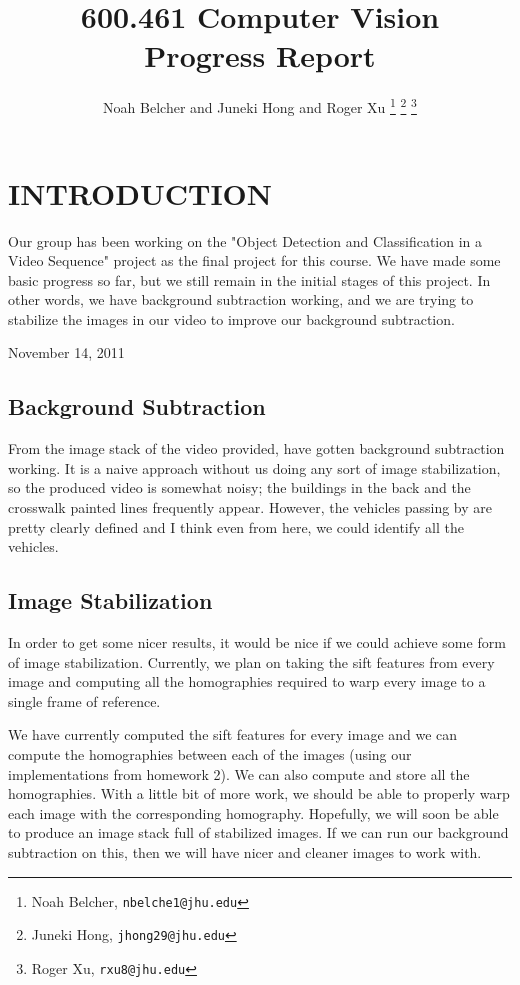 \documentclass[a4paper, 10pt, conference]{ieeeconf}      %
\title{\LARGE \bf
600.461 Computer Vision\\Progress Report
}
\author{Noah Belcher and Juneki Hong and Roger Xu%
\thanks{Noah Belcher,
        {\tt\small nbelche1@jhu.edu}}%
\thanks{Juneki Hong,
        {\tt\small jhong29@jhu.edu}}%
\thanks{Roger Xu,
		{\tt\small rxu8@jhu.edu}}%
}
\begin{document}
\maketitle
\thispagestyle{empty}
\pagestyle{empty}


\section{INTRODUCTION}

Our group has been working on the "Object Detection and Classification in a Video Sequence" project as the final project for this course. We have made some basic progress so far, but we still remain in the initial stages of this project. In other words, we have background subtraction working, and we are trying to stabilize the images in our video to improve our background subtraction.

\hfill November 14, 2011


\subsection{Background Subtraction}
From the image stack of the video provided, have gotten background subtraction working. It is a naive approach without us doing any sort of image stabilization, so the produced video is somewhat noisy; the buildings in the back and the crosswalk painted lines frequently appear. However, the vehicles passing by are pretty clearly defined and I think even from here, we could identify all the vehicles.

\subsection{Image Stabilization}
In order to get some nicer results, it would be nice if we could achieve some form of image stabilization. Currently, we plan on taking the sift features from every image and computing all the homographies required to warp every image to a single frame of reference. \newline

We have currently computed the sift features for every image and we can compute the homographies between each of the images (using our implementations from homework 2). We can also compute and store all the homographies. With a little bit of more work, we should be able to properly warp each image with the corresponding homography. Hopefully, we will soon be able to produce an image stack full of stabilized images. If we can run our background subtraction on this, then we will have nicer and cleaner images to work with. \newline
\end{document}

